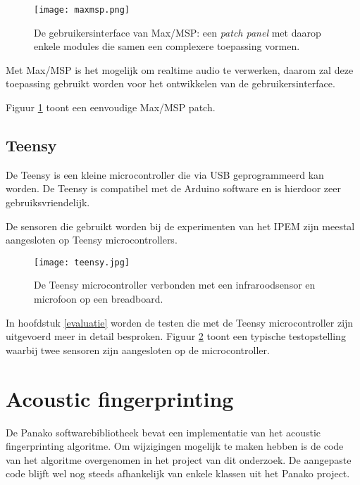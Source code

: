 \begin{figure}[!h]
	\captionsetup{width=0.6\textwidth}
	\caption[Gebruikersinterface van Max/MSP]{De gebruikersinterface van Max/MSP: een \textit{patch panel} met daarop enkele modules die samen een complexere toepassing vormen.}
	\centering
	\advance\parskip0.3cm
	\texttt{[image: maxmsp.png]}
	\label{screenshot-max}
\end{figure}

Met Max/MSP is het mogelijk om realtime audio te  verwerken, daarom zal deze toepassing gebruikt worden voor het ontwikkelen van de gebruikersinterface. 

Figuur \ref{screenshot-max} toont een eenvoudige Max/MSP patch.

\subsection{Teensy}

De Teensy is een kleine microcontroller die via USB geprogrammeerd kan worden. De Teensy is compatibel met de Arduino software en is hierdoor zeer gebruiksvriendelijk. \cite{teensy2016}

De sensoren die gebruikt worden bij de experimenten van het IPEM zijn meestal aangesloten op Teensy microcontrollers.

\begin{figure}[!h]
	\captionsetup{width=0.7\textwidth}
	\caption[Teensy microcontroller]{De Teensy microcontroller verbonden met een infraroodsensor en microfoon op een breadboard.}
	\centering
	\advance\parskip0.3cm
	\texttt{[image: teensy.jpg]}
	\label{teensy-pic}
\end{figure}

In hoofdstuk \ref{evaluatie} worden de testen die met de Teensy microcontroller zijn uitgevoerd meer in detail besproken. Figuur \ref{teensy-pic} toont een typische testopstelling waarbij twee sensoren zijn aangesloten op de microcontroller.

\section{Acoustic fingerprinting}

De Panako softwarebibliotheek bevat een implementatie van het acoustic fingerprinting algoritme. Om wijzigingen mogelijk te maken hebben is de code van het algoritme overgenomen in het project van dit onderzoek. De aangepaste code blijft wel nog steeds afhankelijk van enkele klassen uit het Panako project. 

